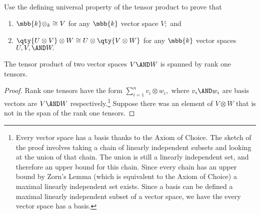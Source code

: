 \documentclass[main.tex]{subfiles}
\begin{document}
\paragraph{}

\begin{exercise}Use the defining universal property of the tensor product
	to prove that 
	\begin{enumerate}
		\item $ \mbb{k}\otimes_k\cong V $ for any $ \mbb{k} $ vector space $ V; $ and
		\item $ \qty{U\otimes V}\otimes W\cong U\otimes\qty{V\otimes W} $ for any $ \mbb{k} $ vector spaces $ U,V,\AND W. $
	\end{enumerate}
\end{exercise}
\begin{lemma}
	The tensor product of two vector spaces $ V\AND W $ is spanned by rank one tensors.
\end{lemma}
\begin{proof}
	Rank one tensors have the form $ \sum_{i=1}^n v_i\otimes w_i,$ where
	$ v_i\AND w_i $ are basis vectors are $ V\AND W$ 
	respectively.\footnote{Every vector space has a basis thanks to the Axiom 
	of Choice. The sketch of the proof involves taking a chain of linearly 
	independent subsets and looking at the union of that chain. The union is 
	still a linearly independent set, and therefore an upper bound for this
	chain. Since every chain has an upper bound by Zorn's Lemma (which is 
	equivalent to the Axiom of Choice) a maximal linearly independent set 
	exists. Since a basis can be defined a maximal linearly independent subset 
	of a vector space, we have the every vector space has a basis. }
	Suppose there was an element of $ V\otimes W $ that is not in
	the span of the rank one tensors. 
\end{proof}
	
\end{document}
